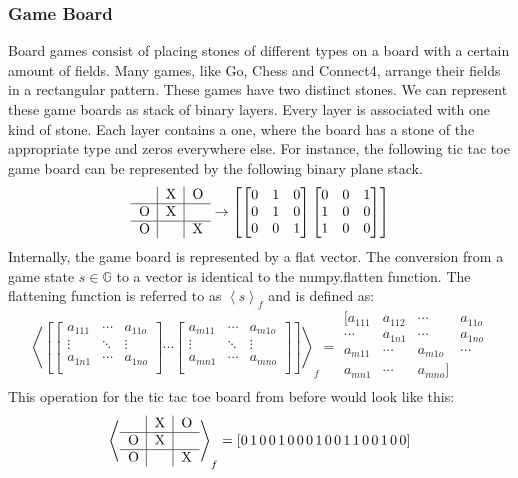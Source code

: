 \documentclass[12pt]{article}
\newcommand{\ticTacToe}[9]{
\begin{tabular}{p{7px}|p{7px}|p{7px}}
  #1 & #2 & #3 \\      \hline
  #4 & #5 & #6 \\      \hline
  #7 & #8 & #9 \\
\end{tabular}
}
\begin{document}
\subsubsection{Game Board}
Board games consist of placing stones of different types on a board with a certain amount of fields. Many games, like Go, Chess and Connect4, arrange their fields in a rectangular pattern. These games have two distinct stones. We can represent these game boards as stack of binary layers. Every layer is associated with one kind of stone. Each layer contains a one, where the board has a stone of the appropriate type and zeros everywhere else. For instance, the following tic tac toe game board can be represented by the following binary plane stack.\[
\ticTacToe{}{X}{O}{O}{X}{}{O}{}{X}\to
\left[ 
\begin{bmatrix}
0 & 1 & 0 \\
0 & 1 & 0 \\
0 & 0 & 1 \\
\end{bmatrix}
\begin{bmatrix}
0 & 0 & 1 \\
1 & 0 & 0 \\
1 & 0 & 0 \\
\end{bmatrix}
\right]
\] 
Internally, the game board is represented by a flat vector. The conversion from a game state \(s \in \mathbb{G}\) to a vector is identical to the numpy.flatten function. The flattening function is referred to as \(\left<s\right>_f\) and is defined as:
\[
\left<
\left[ 
\begin{bmatrix}
a_{111} & \cdots & a_{11o} \\
\vdots & \ddots & \vdots \\
a_{1n1} & \cdots & a_{1no} \\
\end{bmatrix}
\cdots
\begin{bmatrix}
a_{m11} & \cdots &  a_{m1o} \\
\vdots   & \ddots & \vdots   \\
a_{mn1} & \cdots & a_{mno}  \\
\end{bmatrix}
\right]
\right>_f = \begin{matrix}
[ a_{111} & a_{112} & \cdots &  a_{11o} \\
\cdots & a_{1n1}  & \cdots & a_{1no} \\
 a_{m11}  & \cdots & a_{m1o} & \cdots    \\
  a_{mn1} & \cdots   & a_{mno}]\\
\end{matrix}
\]
This operation for the tic tac toe board from before would look like this:
\[
\left<\ticTacToe{}{X}{O}{O}{X}{}{O}{}{X}\right>_f = 
[0\,1\,0\,0\,1\,0\,0\,0\,1\,0 \,0 \,1\,1\,0\,0\,1\,0\,0]
\]
\end{document}
